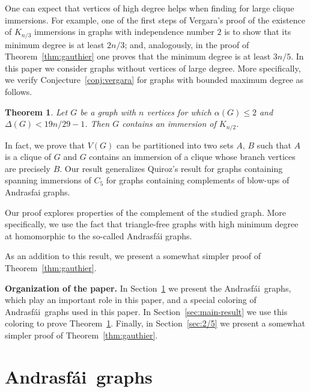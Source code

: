 \documentclass[a4paper,12pt]{article}
\newtheorem{theorem}{Theorem}
\newcommand{\andrasfai}{Andrasf\'ai}
\begin{document}
One can expect that vertices of high degree helps when finding for large clique immersions.
For example, one of the first steps of Vergara's proof of the existence of \(K_{n/3}\) immersions
in graphs with independence number \(2\) is to show that its minimum degree is at least \(2n/3\);
and, analogously, in the proof of Theorem~\ref{thm:gauthier} one proves that the minimum degree is at least \(3n/5\). 
In this paper we consider graphs without vertices of large degree.
More specifically, we verify Conjecture~\ref{conj:vergara} for graphs with bounded maximum degree
as follows.

\begin{theorem}\label{thm:main}
Let \(G\) be a graph with \(n\) vertices for which \(\alpha(G) \leq 2\) 
and \(\Delta(G) < 19n/29 - 1\).
Then \(G\) contains an immersion of \(K_{n/2}\).
\end{theorem}

In fact, we prove that \(V(G)\) can be partitioned into two sets \(A\), \(B\)
such that \(A\) is a clique of \(G\) and \(G\) contains an immersion of a clique whose
branch vertices are precisely \(B\).
Our result generalizes Quiroz's result for graphs containing spanning immersions of \(C_5\)
for graphs containing complements of blow-ups of Andrasfai graphs. 

Our proof explores properties of the complement of the studied graph.
More specifically, we use the fact that triangle-free graphs 
with high minimum degree at homomorphic to the so-called Andrasfái graphs.

As an addition to this result, we present a somewhat simpler proof of Theorem~\ref{thm:gauthier}.

\smallskip
\noindent
\textbf{Organization of the paper.}
In Section~\ref{sec:andrasfai} we present the \andrasfai~graphs,
which play an important role in this paper,
and a special coloring of \andrasfai~graphs used in this paper.
In Section~\ref{sec:main-result} we use this coloring to prove Theorem~\ref{thm:main}.
Finally, in Section~\ref{sec:2/5} we present a somewhat simpler proof of Theorem~\ref{thm:gauthier}.

\section{\andrasfai~graphs}\label{sec:andrasfai}
\end{document}
